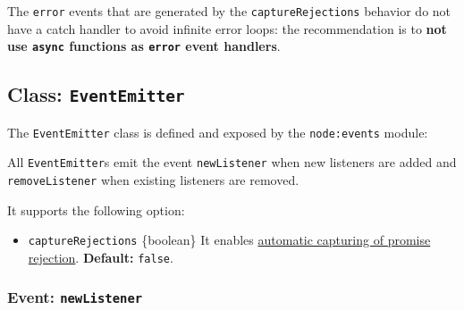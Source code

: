 The \texttt{\textquotesingle{}error\textquotesingle{}} events that are
generated by the \texttt{captureRejections} behavior do not have a catch
handler to avoid infinite error loops: the recommendation is to
\textbf{not use \texttt{async} functions as
\texttt{\textquotesingle{}error\textquotesingle{}} event handlers}.

\subsection{\texorpdfstring{Class:
\texttt{EventEmitter}}{Class: EventEmitter}}\label{class-eventemitter}

The \texttt{EventEmitter} class is defined and exposed by the
\texttt{node:events} module:

\begin{Shaded}
\begin{Highlighting}[]
\NormalTok{ \{ }\NormalTok{ \} } \OperatorTok{;}
\end{Highlighting}
\end{Shaded}

\begin{Shaded}
\begin{Highlighting}[]
  \OperatorTok{=} \NormalTok{(}\NormalTok{)}\OperatorTok{;}
\end{Highlighting}
\end{Shaded}

All \texttt{EventEmitter}s emit the event
\texttt{\textquotesingle{}newListener\textquotesingle{}} when new
listeners are added and
\texttt{\textquotesingle{}removeListener\textquotesingle{}} when
existing listeners are removed.

It supports the following option:

\begin{itemize}
\tightlist
\item
  \texttt{captureRejections} \{boolean\} It enables
  \hyperref[capture-rejections-of-promises]{automatic capturing of
  promise rejection}. \textbf{Default:} \texttt{false}.
\end{itemize}

\subsubsection{\texorpdfstring{Event:
\texttt{\textquotesingle{}newListener\textquotesingle{}}}{Event: \textquotesingle newListener\textquotesingle{}}}\label{event-newlistener}

